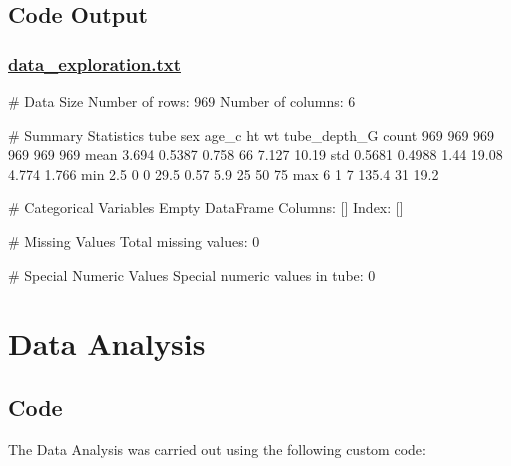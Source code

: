 \documentclass[11pt]{article}
\begin{document}
\subsection{Code Output}\hypertarget{file-data-exploration-txt}{}

\subsubsection*{\hyperlink{code-Data Exploration-data-exploration-txt}{data\_exploration.txt}}

\begin{codeoutput}
# Data Size
Number of rows: 969
Number of columns: 6

# Summary Statistics
        tube    sex  age_c    ht    wt  tube_depth_G
count    969    969    969   969   969           969
mean   3.694 0.5387  0.758    66 7.127         10.19
std   0.5681 0.4988   1.44 19.08 4.774         1.766
min      2.5      0      0  29.5  0.57           5.9
25%
50%
75%
max        6      1      7 135.4    31          19.2

# Categorical Variables
Empty DataFrame
Columns: []
Index: []

# Missing Values
Total missing values: 0

# Special Numeric Values
Special numeric values in tube: 0

\end{codeoutput}

\section{Data Analysis}
\subsection{{Code}}
The Data Analysis was carried out using the following custom code:
\end{document}
